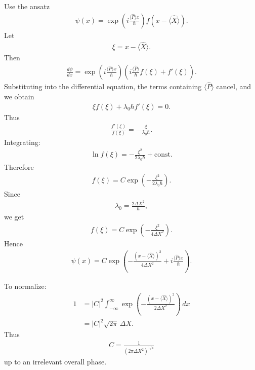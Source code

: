 \documentclass[11pt,a4paper]{scrartcl}
\begin{document}
\begin{enumerate}[label=(\alph*)]
\begin{calculationbox}
        Use the ansatz
        \begin{align*}
            \psi(x)=\exp\!\left(i\frac{\langle \hat{P}\rangle x}{\hbar}\right) f(x-\langle \hat{X}\rangle).
        \end{align*}
        Let
        \begin{align*}
            \xi = x-\langle \hat{X}\rangle.
        \end{align*}
        Then
        \begin{align*}
            \frac{d\psi}{dx}
            = \exp\!\left(i\frac{\langle \hat{P}\rangle x}{\hbar}\right)
            \left(
                i\frac{\langle \hat{P}\rangle}{\hbar} f(\xi) + f'(\xi)
            \right).
        \end{align*}
        Substituting into the differential equation, the terms containing $\langle \hat{P}\rangle$ cancel, and we obtain
        \begin{align*}
            \xi f(\xi) + \lambda_0 \hbar f'(\xi) = 0.
        \end{align*}
        Thus
        \begin{align*}
            \frac{f'(\xi)}{f(\xi)} = - \frac{\xi}{\lambda_0 \hbar}.
        \end{align*}
        Integrating:
        \begin{align*}
            \ln f(\xi) = -\frac{\xi^2}{2\lambda_0 \hbar} + \text{const}.
        \end{align*}
        Therefore
        \begin{align*}
            f(\xi) = C \exp\!\left(-\frac{\xi^2}{2\lambda_0 \hbar}\right).
        \end{align*}
        Since
        \begin{align*}
            \lambda_0 = \frac{2\Delta X^2}{\hbar},
        \end{align*}
        we get
        \begin{align*}
            f(\xi) = C \exp\!\left(-\frac{\xi^2}{4\Delta X^2}\right).
        \end{align*}
        Hence
        \begin{align*}
            \psi(x)
            = C \exp\!\left(
                -\frac{(x-\langle \hat{X}\rangle)^2}{4\Delta X^2}
                + i\frac{\langle \hat{P}\rangle x}{\hbar}
            \right).
        \end{align*}

        To normalize:
        \begin{align*}
            1
            &= |C|^2 \int_{-\infty}^{\infty}
            \exp\!\left(-\frac{(x-\langle \hat{X}\rangle)^2}{2\Delta X^2}\right)\,dx
            \\
            &= |C|^2 \sqrt{2\pi}\,\Delta X.
        \end{align*}
        Thus
        \begin{align*}
            C = \frac{1}{(2\pi \Delta X^2)^{1/4}}
        \end{align*}
        up to an irrelevant overall phase.


\end{calculationbox}
\end{enumerate}
\end{document}
